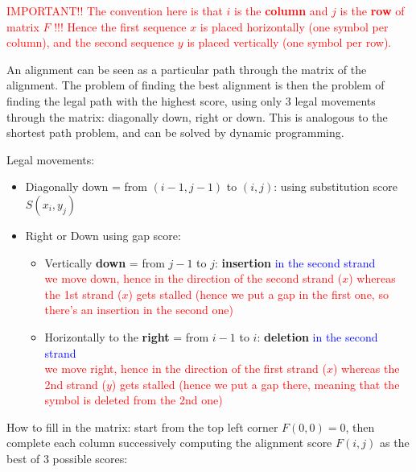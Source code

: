 \textcolor{red}{IMPORTANT!! The convention here is that $i$ is the {\bf column} and $j$ is the {\bf row} of matrix $F$ !!! Hence the first sequence $x$ is placed horizontally (one symbol per column), and the second sequence $y$ is placed vertically (one symbol per row).}

An alignment can be seen as a particular path through the matrix of the alignment. The problem of finding the best alignment is then the problem of finding the legal path with the highest score, using only 3 legal movements through the matrix: diagonally down, right or down. This is analogous to the shortest path problem, and can be solved by dynamic programming.

Legal movements:
\begin{itemize}
\item Diagonally down = from $(i-1, j-1)$ to $(i,j)$:
using substitution score $S(x_i, y_j)$
%
\item Right or Down using gap score:
  \begin{itemize}
%
  \item Vertically {\bf down} = from $j-1$ to $j$: {\bf insertion} \textcolor{blue}{in the second strand} \\
\textcolor{red}{we move down, hence in the direction of the second strand ($x$) whereas the 1st strand ($x$) gets stalled (hence we put a gap in the first one, so there's an insertion in the second one)}
%
  \item Horizontally to the {\bf right} = from $i-1$ to $i$: {\bf deletion} \textcolor{blue}{in the second strand}\\
\textcolor{red}{we move right, hence in the direction of the first strand ($x$) whereas the 2nd strand ($y$) gets stalled (hence we put a gap there, meaning that the symbol is deleted from the 2nd one)}
%
  \end{itemize}
\end{itemize}

How to fill in the matrix: start from the top left corner $F(0,0)=0$, then complete each column successively computing the alignment score $F(i,j)$ as the best of 3 possible scores:


